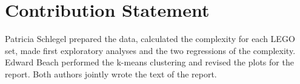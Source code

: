 \documentclass{article}
\theoremstyle{plain}
\theoremstyle{definition}
\theoremstyle{remark}
\begin{document}
\section*{Contribution Statement}

Patricia Schlegel prepared the data, calculated the complexity for each LEGO set, made first exploratory analyses and the two regressions of the complexity. Edward Beach performed the k-means clustering and revised the plots for the report. Both authors jointly wrote the text of the report.




\end{document}
